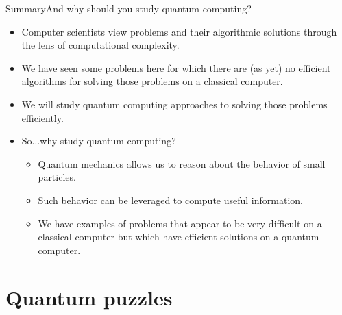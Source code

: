 \begin{frame}{Summary}{And why should you study quantum computing?}

\begin{itemize}
    \item Computer scientists view problems and their algorithmic solutions through the lens of computational complexity.
    \item We have seen some problems here for which there are (as yet) no efficient algorithms for solving those problems on a classical computer.
    \item We will study quantum computing approaches to solving those problems efficiently.
    \item So$\ldots$why study quantum computing?
    \begin{itemize}
        \item Quantum mechanics allows us to reason about the behavior of small particles.
        \item Such behavior can be leveraged to compute useful information.
        \item We have examples of problems that appear to be very difficult on a classical computer but which have efficient solutions on a quantum computer.
    \end{itemize}
\end{itemize}
    
\end{frame}

\section*{Quantum puzzles}

